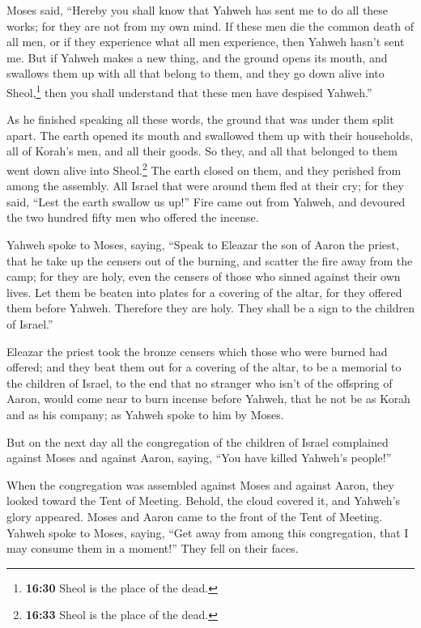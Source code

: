  Moses said, ``Hereby you shall know that Yahweh has sent
me to do all these works; for they are not from my own mind.
 If these men die the common death of all men, or if they
experience what all men experience, then Yahweh hasn't sent me.
 But if Yahweh makes a new thing, and the ground opens
its mouth, and swallows them up with all that belong to them, and they
go down alive into Sheol,\footnote{\textbf{16:30} Sheol is the place of
  the dead.} then you shall understand that these men have despised
Yahweh.''

 As he finished speaking all these words, the ground that
was under them split apart.  The earth opened its mouth
and swallowed them up with their households, all of Korah's men, and all
their goods.  So they, and all that belonged to them went
down alive into Sheol.\footnote{\textbf{16:33} Sheol is the place of the
  dead.} The earth closed on them, and they perished from among the
assembly.  All Israel that were around them fled at their
cry; for they said, ``Lest the earth swallow us up!'' 
Fire came out from Yahweh, and devoured the two hundred fifty men who
offered the incense.

 Yahweh spoke to Moses, saying,  ``Speak
to Eleazar the son of Aaron the priest, that he take up the censers out
of the burning, and scatter the fire away from the camp; for they are
holy,  even the censers of those who sinned against their
own lives. Let them be beaten into plates for a covering of the altar,
for they offered them before Yahweh. Therefore they are holy. They shall
be a sign to the children of Israel.''

 Eleazar the priest took the bronze censers which those
who were burned had offered; and they beat them out for a covering of
the altar,  to be a memorial to the children of Israel,
to the end that no stranger who isn't of the offspring of Aaron, would
come near to burn incense before Yahweh, that he not be as Korah and as
his company; as Yahweh spoke to him by Moses.

 But on the next day all the congregation of the children
of Israel complained against Moses and against Aaron, saying, ``You have
killed Yahweh's people!''

 When the congregation was assembled against Moses and
against Aaron, they looked toward the Tent of Meeting. Behold, the cloud
covered it, and Yahweh's glory appeared.  Moses and Aaron
came to the front of the Tent of Meeting.  Yahweh spoke
to Moses, saying,  ``Get away from among this
congregation, that I may consume them in a moment!'' They fell on their
faces.

